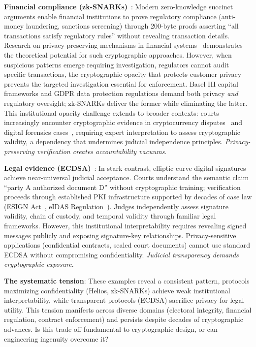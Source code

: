 \documentclass{ieeeaccess}
\begin{document}
\textbf{Financial compliance (zk-SNARKs)}~\cite{Groth16}: Modern zero-knowledge succinct arguments enable financial institutions to prove regulatory compliance (anti-money laundering, sanctions screening) through 200-byte proofs asserting ``all transactions satisfy regulatory rules'' without revealing transaction details. Research on privacy-preserving mechanisms in financial systems~\cite{Garratt19} demonstrates the theoretical potential for such cryptographic approaches. However, when suspicious patterns emerge requiring investigation, regulators cannot audit specific transactions, the cryptographic opacity that protects customer privacy prevents the targeted investigation essential for enforcement. Basel III capital frameworks and GDPR data protection regulations demand both privacy \emph{and} regulatory oversight; zk-SNARKs deliver the former while eliminating the latter. This institutional opacity challenge extends to broader contexts: courts increasingly encounter cryptographic evidence in cryptocurrency disputes~\cite{Narayanan16} and digital forensics cases~\cite{Casey16}, requiring expert interpretation to assess cryptographic validity, a dependency that undermines judicial independence principles. \emph{Privacy-preserving verification creates accountability vacuums}.

\textbf{Legal evidence (ECDSA)}~\cite{Johnson01}: In stark contrast, elliptic curve digital signatures achieve near-universal judicial acceptance. Courts understand the semantic claim ``party A authorized document D'' without cryptographic training; verification proceeds through established PKI infrastructure supported by decades of case law (ESIGN Act~\cite{ESIGN00}, eIDAS Regulation~\cite{eIDAS14}). Judges independently assess signature validity, chain of custody, and temporal validity through familiar legal frameworks. However, this institutional interpretability requires revealing signed messages publicly and exposing signature-key relationships. Privacy-sensitive applications (confidential contracts, sealed court documents) cannot use standard ECDSA without compromising confidentiality. \emph{Judicial transparency demands cryptographic exposure}.

\textbf{The systematic tension}: These examples reveal a consistent pattern, protocols maximizing confidentiality (Helios, zk-SNARKs) achieve weak institutional interpretability, while transparent protocols (ECDSA) sacrifice privacy for legal utility. This tension manifests across diverse domains (electoral integrity, financial regulation, contract enforcement) and persists despite decades of cryptographic advances. Is this trade-off fundamental to cryptographic design, or can engineering ingenuity overcome it? 
\end{document}

